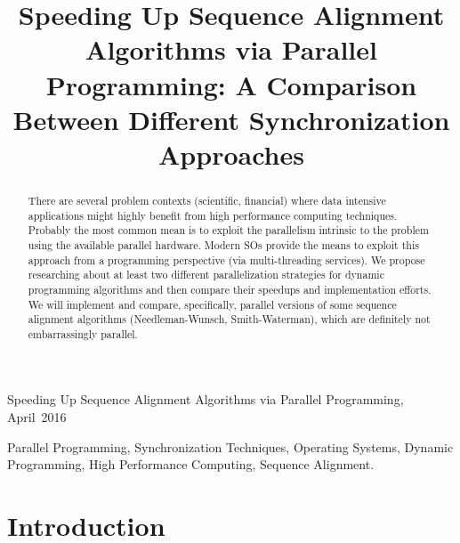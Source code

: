 \documentclass[journal]{IEEEtran}
\begin{document}
\title{Speeding Up Sequence Alignment Algorithms via Parallel Programming: A Comparison Between Different Synchronization Approaches}

\author{
}

%
{Speeding Up Sequence Alignment Algorithms via Parallel Programming, April~2016}

\maketitle

\begin{abstract}
	There are several problem contexts (scientific, financial) where data intensive applications might highly benefit from high performance computing techniques. Probably the most common mean is to exploit the parallelism intrinsic to the problem using the available parallel hardware. Modern SOs provide the means to exploit this approach from a programming perspective (via multi-threading services). We propose researching about at least two different parallelization strategies for dynamic programming algorithms and then compare their speedups and implementation efforts. We will implement and compare, specifically, parallel versions of some sequence alignment algorithms (Needleman-Wunsch, Smith-Waterman), which are definitely not embarrassingly parallel.
\end{abstract}

\begin{IEEEkeywords}
	Parallel Programming, Synchronization Techniques, Operating Systems, Dynamic Programming, High Performance Computing, Sequence Alignment.
\end{IEEEkeywords}

\section{Introduction}

\cite{edmiston1988parallel} \cite{galper1990parallel} \cite{hughey1996parallel} \cite{wozniak1997using} \cite{rognes2000six} \cite{martins2001multithreaded} \cite{anvik2001generating} \cite{aluru2003parallel}\cite{stivala2010lock} \cite{farrar2007striped} \cite{schatz2007high} \cite{manavski2008cuda} \cite{vouzis2011gpu} \cite{rognes2011faster} \cite{benkrid2012high} \cite{liu2013cudasw++} \cite{li2014pairwise} \cite{wilton2014faster} \cite{maleki2014parallelizing}

\ifCLASSOPTIONcaptionsoff
  \newpage
\fi



\end{document}
